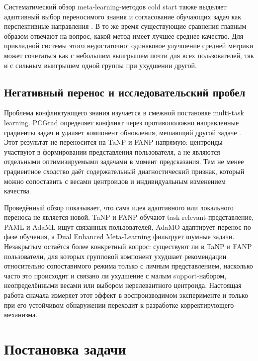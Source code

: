 \documentclass[12pt,a4paper]{article}
\begin{document}
Систематический обзор meta-learning-методов cold start также выделяет
адаптивный выбор переносимого знания и согласование обучающих задач как
перспективные направления \citep{metacoldstartreview2025}. В то же время
существующие сравнения главным образом отвечают на вопрос, какой метод имеет
лучшее среднее качество. Для прикладной системы этого недостаточно: одинаковое
улучшение средней метрики может сочетаться как с небольшим выигрышем почти для
всех пользователей, так и с сильным выигрышем одной группы при ухудшении
другой.

\subsection{Негативный перенос и исследовательский пробел}

Проблема конфликтующего знания изучается в смежной постановке multi-task
learning. PCGrad определяет конфликт через противоположно направленные
градиенты задач и удаляет компонент обновления, мешающий другой задаче
\citep{yu2020pcgrad}. Этот результат не переносится на TaNP и FANP напрямую:
центроиды участвуют в формировании представления пользователя, а не являются
отдельными оптимизируемыми задачами в момент предсказания. Тем не менее
градиентное сходство даёт содержательный диагностический признак, который
можно сопоставить с весами центроидов и индивидуальным изменением качества.

Проведённый обзор показывает, что сама идея адаптивного или локального
переноса не является новой. TaNP и FANP обучают task-relevant-представление,
PAML и AdaML ищут связанных пользователей, AdaMO адаптирует перенос по фазе
обучения, а Dual Enhanced Meta-Learning фильтрует шумные задачи. Незакрытым
остаётся более конкретный вопрос: существуют ли в TaNP и FANP пользователи,
для которых групповой компонент ухудшает рекомендации относительно
сопоставимого режима только с личным представлением, насколько часто это
происходит и связано ли ухудшение с малым support-набором, неопределёнными
весами или выбором нерелевантного центроида. Настоящая работа сначала измеряет
этот эффект в воспроизводимом эксперименте и только при его устойчивом
обнаружении переходит к разработке корректирующего механизма.

\section{Постановка задачи}
\end{document}
